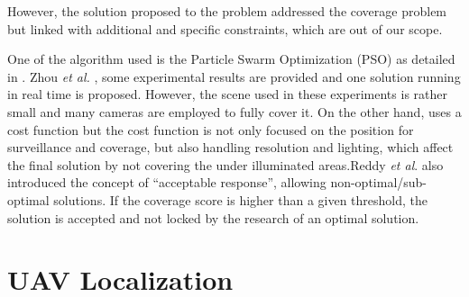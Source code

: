 
However, the solution proposed to the problem addressed the coverage problem but linked with additional and specific constraints, which are out of our scope. 
 
 One of the algorithm used is the Particle Swarm Optimization (PSO) as detailed in \cite{c10,c11}. Zhou \textit{et al.} \cite{c10}, some experimental results are provided and one solution running in real time is proposed. However, the scene used in these experiments is rather small and many cameras are employed to fully cover it.  On the other hand, \cite{c11} uses a cost function but the cost function is not only focused on the position for surveillance and coverage, but also handling resolution and lighting, which affect the final solution by not covering the under illuminated areas.Reddy \textit{et al}. \cite{c11} also introduced the concept of “acceptable response”, allowing non-optimal/sub-optimal solutions. If the coverage score is higher than a given threshold, the solution is accepted and not locked by the research of an optimal solution. 
 
 \section{UAV Localization} \label{localization_Back}
 
